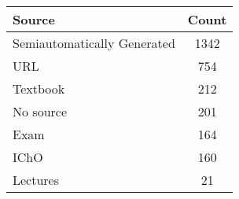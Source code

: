 \begin{tabular}{lc}
\toprule
Source & Count \\
\midrule
Semiautomatically Generated & 1342 \\
URL & 754 \\
Textbook & 212 \\
No source & 201 \\
Exam & 164 \\
IChO & 160 \\
Lectures & 21 \\
\bottomrule
\end{tabular}
